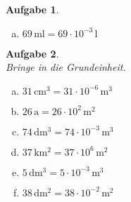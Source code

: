 \documentclass[12pt,fleqn]{article}
\theoremstyle{aufg}
\newtheorem{aufgabe}{Aufgabe}
\theoremstyle{bsp}
\begin{document}
\begin{flushleft}
\begin{aufgabe}
\begin{multicols}{3}
\begin{enumerate}[a)]
\item 
$69\,\mathrm{ml}=69\cdot 10^{-3} \,\mathrm{l^{}}$
\end{enumerate} 
\end{multicols} 
\end{aufgabe} 
\begin{aufgabe} ~ \\ 
Bringe in die Grundeinheit. \\ 
\begin{multicols}{3} 
\begin{enumerate}[a)] 
\item 
$31\,\mathrm{cm^3}=31\cdot 10^{-6} \,\mathrm{m^{3}}$
\item 
$26\,\mathrm{a}=26\cdot 10^{2} \,\mathrm{m^2} $
\item 
$74\,\mathrm{dm^3}=74\cdot 10^{-3} \,\mathrm{m^{3}}$
\item 
$37\,\mathrm{km^2}=37\cdot 10^{6} \,\mathrm{m^{2}}$
\item 
$5\,\mathrm{dm^3}=5\cdot 10^{-3} \,\mathrm{m^{3}}$
\item 
$38\,\mathrm{dm^2}=38\cdot 10^{-2} \,\mathrm{m^{2}}$
\end{enumerate} 
\end{multicols} 
\end{aufgabe} 
\end{flushleft} 
\end{document}
